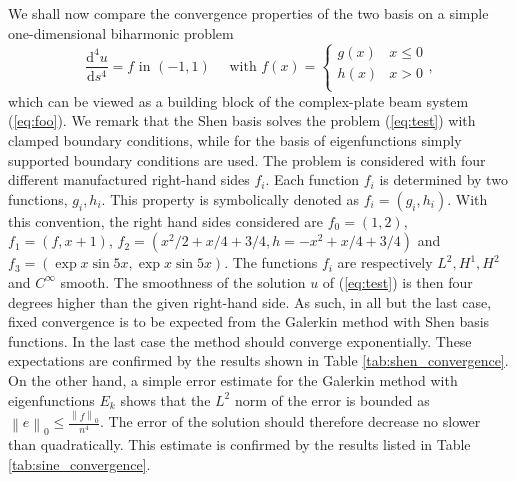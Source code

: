 \documentclass{marine_2015}
\newcommand{\inner}[2]{\ensuremath{\left(#1, #2\right)}}
\newcommand{\norm}[1]{\ensuremath{\left\|#1\right\|}}
\newcommand{\deriv}[2]{\ensuremath{\frac{\mathrm{d}#1}{\mathrm{d}#2}}}
\begin{document}
We shall now compare the convergence properties of the two basis on a simple 
one-dimensional biharmonic problem
\begin{equation}
  \label{eq:test}
  \deriv{^4u}{s^4} = f\text{ in }\left(-1, 1 \right)\quad\text{ with }f(x)=\begin{cases}
      g(x) & x \leq 0 \\
      h(x) & x > 0 \\
    \end{cases},
  \end{equation}
which can be viewed as a building block of the complex-plate beam system (\ref{eq:foo}).
We remark that the Shen basis solves the problem (\ref{eq:test}) with clamped
boundary conditions, while for the basis of eigenfunctions simply supported
boundary conditions are used. The problem is considered with four different
manufactured right-hand sides $f_i$. Each function $f_i$ is determined by two 
functions, $g_i, h_i$. This property is symbolically denoted as $f_i=\left(g_i, h_i\right)$. 
With this convention, the right hand sides considered are $f_0=\inner{1}{2}$, 
$f_1=\inner{f}{x+1}$,
$f_2=\inner{x^2/2 + x/4 + 3/4}{h=-x^2 + x/4 + 3/4}$ and
$f_3=\inner{\exp{x}\sin{5x}}{\exp{x}\sin{5x}}$. The functions $f_i$ are
respectively $L^2, H^1, H^2$ and $C^{\infty}$ smooth. The smoothness of the
solution $u$ of (\ref{eq:test}) is then four degrees higher than the given
right-hand side. As such, in all but the last case, fixed convergence is to be
expected from the Galerkin method with Shen basis functions. In the last case
the method should converge exponentially. These expectations are confirmed by
the results shown in Table \ref{tab:shen_convergence}. On the other hand, a simple error
estimate for the Galerkin method with eigenfunctions $E_k$ shows that the $L^2$
norm of the error is bounded as $\norm{e}_0\leq\tfrac{\norm{f}_0}{n^4}$. The
error of the solution should therefore decrease no slower than quadratically.
This estimate is confirmed by the results listed in Table
\ref{tab:sine_convergence}.
\end{document}
